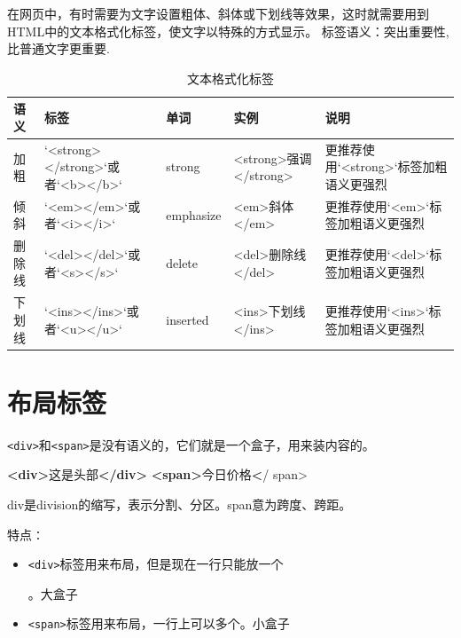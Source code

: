 \documentclass[
]{book}
\newenvironment{Shaded}{\begin{snugshade}}{\end{snugshade}}
\newcommand{\ErrorTok}[1]{\textcolor[rgb]{0.64,0.00,0.00}{\textbf{#1}}}
\newcommand{\KeywordTok}[1]{\textcolor[rgb]{0.13,0.29,0.53}{\textbf{#1}}}
\newcommand{\NormalTok}[1]{#1}
\providecommand{\tightlist}{%
  \setlength{\itemsep}{0pt}\setlength{\parskip}{0pt}}
\begin{document}
在网页中，有时需要为文字设置粗体、斜体或下划线等效果，这时就需要用到HTML中的文本格式化标签，使文字以特殊的方式显示。
标签语义：突出重要性,比普通文字更重要.

\begin{table}

\caption{\label{tab:unnamed-chunk-6}文本格式化标签}
\centering
\begin{tabular}[t]{lllll}
\toprule
语义 & 标签 & 单词 & 实例 & 说明\\
\midrule
加粗 & `<strong></strong>`或者`<b></b>` & strong & <strong>强调</strong> & 更推荐使用`<strong>`标签加粗语义更强烈\\
倾斜 & `<em></em>`或者`<i></i>` & emphasize & <em>斜体</em> & 更推荐使用`<em>`标签加粗语义更强烈\\
删除线 & `<del></del>`或者`<s></s>` & delete & <del>删除线</del> & 更推荐使用`<del>`标签加粗语义更强烈\\
下划线 & `<ins></ins>`或者`<u></u>` & inserted & <ins>下划线</ins> & 更推荐使用`<ins>`标签加粗语义更强烈\\
\bottomrule
\end{tabular}
\end{table}

\hypertarget{ux5e03ux5c40ux6807ux7b7e}{%
\section{布局标签}\label{ux5e03ux5c40ux6807ux7b7e}}

\texttt{\textless{}div\textgreater{}}和\texttt{\textless{}span\textgreater{}}是没有语义的，它们就是一个盒子，用来装内容的。

\begin{Shaded}
\begin{Highlighting}[]
\KeywordTok{\textless{}div\textgreater{}}\NormalTok{这是头部}\KeywordTok{\textless{}/div\textgreater{}}
\KeywordTok{\textless{}span\textgreater{}}\NormalTok{今日价格}\ErrorTok{\textless{}}\NormalTok{/ span\textgreater{}}
\end{Highlighting}
\end{Shaded}

div是division的缩写，表示分割、分区。span意为跨度、跨距。

特点∶

\begin{itemize}
\tightlist
\item
  \texttt{\textless{}div\textgreater{}}标签用来布局，但是现在一行只能放一个

  。大盒子
\item
  \texttt{\textless{}span\textgreater{}}标签用来布局，一行上可以多个。小盒子
\end{itemize}
\end{document}
